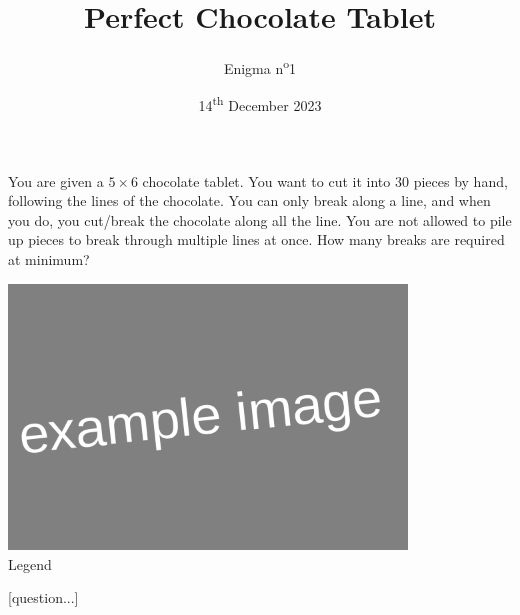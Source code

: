 \documentclass[a4paper, top=10mm]{article}
\title{\textbf{\huge{Perfect Chocolate Tablet}}}
\author{Enigma n\textsuperscript{o}1}
\date{14\textsuperscript{th} December 2023}
\begin{document}
	\maketitle
	
	You are given a $5 \times 6$ chocolate tablet.
	You want to cut it into $30$ pieces by hand, following the lines of the chocolate.
	You can only break along a line, and when you do, you cut/break the chocolate along all the line.
	You are not allowed to pile up pieces to break through multiple lines at once.
	How many breaks are required at minimum?
	
	\begin{center}
		\includegraphics[height=200pt]{00example.png}\\
		Legend
	\end{center}
	
	[question...]
	
\end{document}
